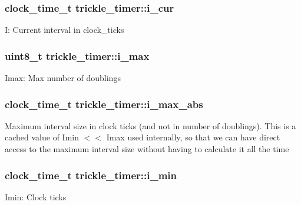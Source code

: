 \subsubsection[{i\+\_\+cur}]{\setlength{\rightskip}{0pt plus 5cm}clock\+\_\+time\+\_\+t trickle\+\_\+timer\+::i\+\_\+cur}\label{structtrickle__timer_a2e49b516f2674d3c8e0fecdd72db0c8e}
I\+: Current interval in clock\+\_\+ticks \hypertarget{structtrickle__timer_a3985822217cd5698c656bad071e7ce97}{}
\subsubsection[{i\+\_\+max}]{\setlength{\rightskip}{0pt plus 5cm}uint8\+\_\+t trickle\+\_\+timer\+::i\+\_\+max}\label{structtrickle__timer_a3985822217cd5698c656bad071e7ce97}
Imax\+: Max number of doublings \hypertarget{structtrickle__timer_a4d0201ed9a65814148348f80d907f1a5}{}
\subsubsection[{i\+\_\+max\+\_\+abs}]{\setlength{\rightskip}{0pt plus 5cm}clock\+\_\+time\+\_\+t trickle\+\_\+timer\+::i\+\_\+max\+\_\+abs}\label{structtrickle__timer_a4d0201ed9a65814148348f80d907f1a5}
Maximum interval size in clock ticks (and not in number of doublings). This is a cached value of Imin $<$$<$ Imax used internally, so that we can have direct access to the maximum interval size without having to calculate it all the time \hypertarget{structtrickle__timer_ad47176bf75ac13d688865dec639db430}{}
\subsubsection[{i\+\_\+min}]{\setlength{\rightskip}{0pt plus 5cm}clock\+\_\+time\+\_\+t trickle\+\_\+timer\+::i\+\_\+min}\label{structtrickle__timer_ad47176bf75ac13d688865dec639db430}
Imin\+: Clock ticks \hypertarget{structtrickle__timer_aeabbbddcf3e3b015e9a8fd9f211bb21d}{}
